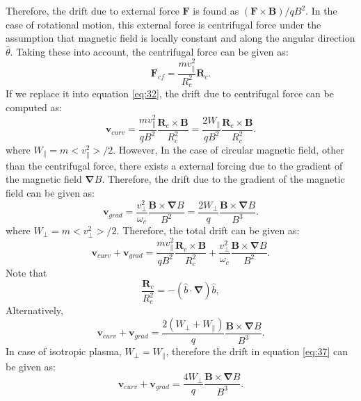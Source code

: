 \documentclass[11pt]{amsart}
\begin{document}
Therefore, the drift due to external force $\mathbf{F}$ is found as $(\mathbf{F}\times\mathbf{B})/q B^2$. In the case of rotational motion, this external force is centrifugal force under the assumption that magnetic field is locally constant and along the angular direction $\hat{\theta}$.
Taking these into account, the centrifugal force can be  given as:
\begin{equation}
\label{eq:33}
\mathbf{F}_{cf}=\frac{m v_{\parallel}^2}{R_{c}^2}\mathbf{R}_c.
\end{equation}
If we replace it into equation \ref{eq:32}, the drift due to centrifugal force can be computed as:
\begin{equation}
\label{eq:34}
\mathbf{v}_{curv}=\frac{m v_{\parallel}^2}{q B^2}\frac{\mathbf{R}_c\times\mathbf{B}}{R_{c}^2}=\frac{2 W_{\parallel}}{q B^2}\frac{\mathbf{R}_c\times\mathbf{B}}{R_{c}^2}.
\end{equation}
where $W_{\parallel}=m<v_{\parallel}^2>/2$. However, In the case of circular magnetic field, other than the centrifugal force, there exists a external forcing due to the gradient of the magnetic field $\mathbf{\nabla}B$. Therefore, the drift due to the gradient of the magnetic field can be given as:
\begin{equation}
\label{eq:35}
\mathbf{v}_{grad}=\frac{ v_{\perp}^2}{\omega_c}\frac{\mathbf{B}\times\mathbf{\nabla}B}{B^2}=\frac{ 2 W_{\perp}}{q}\frac{\mathbf{B}\times\mathbf{\nabla}B}{B^3}.
\end{equation}
where $W_{\perp}=m<v_{\perp}^2>/2$. Therefore, the total drift can be given as:
\begin{equation}
\label{eq:36}
\mathbf{v}_{curv}+\mathbf{v}_{grad}=\frac{m v_{\parallel}^2}{q B^2}\frac{\mathbf{R}_c\times\mathbf{B}}{R_{c}^2}+\frac{ v_{\perp}^2}{\omega_c}\frac{\mathbf{B}\times\mathbf{\nabla}B}{B^2}.
\end{equation}
Note that 
\begin{equation*}
\frac{\mathbf{R}_c}{R_{c}^2}=-(\hat{b}\cdot\mathbf{\nabla})\hat{b},
\end{equation*}
Alternatively,
\begin{equation}
\label{eq:37}
\mathbf{v}_{curv}+\mathbf{v}_{grad}=\frac{ 2(W_{\perp}+W_{\parallel})}{q}\frac{\mathbf{B}\times\mathbf{\nabla}B}{B^3}.
\end{equation}
In case of isotropic plasma, $W_{\perp}=W_{\parallel}$, therefore the drift in equation \ref{eq:37} can be given as:
\begin{equation}
\label{eq:37}
\mathbf{v}_{curv}+\mathbf{v}_{grad}=\frac{ 4 W_{\perp}}{q}\frac{\mathbf{B}\times\mathbf{\nabla}B}{B^3}.
\end{equation}
\end{document}
